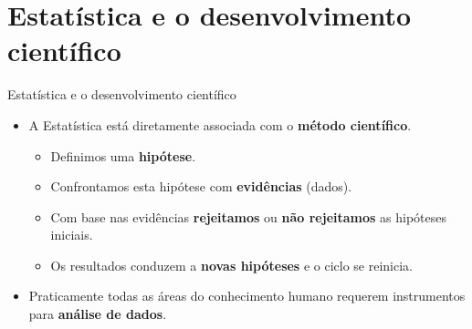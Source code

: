 \documentclass[
  ignorenonframetext,
  serif,
  professionalfont,
  usenames,
  dvipsnames,
  aspectratio = 169]{beamer}
\providecommand{\tightlist}{%
  \setlength{\itemsep}{0pt}\setlength{\parskip}{0pt}}
\renewcommand{\tightlist}{%
  \setlength{\itemsep}{0\baselineskip}
  \setlength{\parskip}{0.25\baselineskip}
}
\def\endColumns{\end{minipage}}%
\begin{document}

\section{Estatística e o desenvolvimento
científico}\label{estatuxedstica-e-o-desenvolvimento-cientuxedfico}

\begin{frame}{Estatística e o desenvolvimento científico}
\label{estatuxedstica-e-o-desenvolvimento-cientuxedfico-1}
\begin{itemize}
\tightlist
\item
  A Estatística está diretamente associada com o
  \textbf{método científico}.

  \begin{itemize}
  \tightlist
  \item
    Definimos uma \textbf{hipótese}.
  \item
    Confrontamos esta hipótese com \textbf{evidências} (dados).
  \item
    Com base nas evidências \textbf{rejeitamos} ou
    \textbf{não rejeitamos} as hipóteses iniciais.
  \item
    Os resultados conduzem a \textbf{novas hipóteses} e o ciclo se
    reinicia.
  \end{itemize}
\end{itemize}

\vspace{1cm}

\begin{itemize}
\tightlist
\item
  Praticamente todas as áreas do conhecimento humano requerem
  instrumentos para \textbf{análise de dados}.
\end{itemize}
\end{frame}
\end{document}
